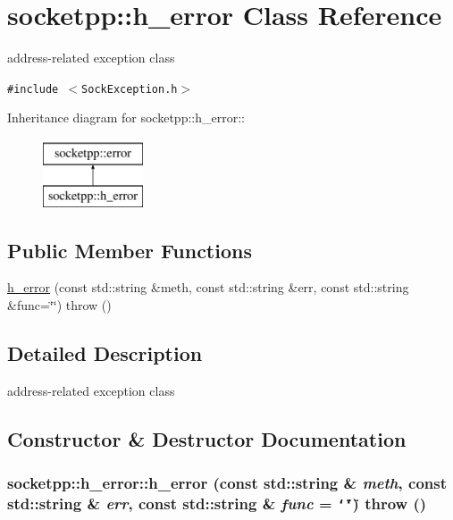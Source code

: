 \hypertarget{classsocketpp_1_1h__error}{
\section{socketpp::h\_\-error Class Reference}
\label{classsocketpp_1_1h__error}
}
address-related exception class  


{\tt \#include $<$SockException.h$>$}

Inheritance diagram for socketpp::h\_\-error::\begin{figure}[H]
\begin{center}
\leavevmode
\includegraphics[height=2cm]{classsocketpp_1_1h__error}
\end{center}
\end{figure}
\subsection*{Public Member Functions}
\begin{CompactItemize}
\item 
\hyperlink{classsocketpp_1_1h__error_c15a1c6216114250241349fdfcdeb98a}{h\_\-error} (const std::string \&meth, const std::string \&err, const std::string \&func=\char`\"{}\char`\"{})  throw ()
\end{CompactItemize}


\subsection{Detailed Description}
address-related exception class 

\subsection{Constructor \& Destructor Documentation}
\hypertarget{classsocketpp_1_1h__error_c15a1c6216114250241349fdfcdeb98a}{
\subsubsection[{h\_\-error}]{\setlength{\rightskip}{0pt plus 5cm}socketpp::h\_\-error::h\_\-error (const std::string \& {\em meth}, \/  const std::string \& {\em err}, \/  const std::string \& {\em func} = {\tt \char`\"{}\char`\"{}})  throw ()}}
\label{classsocketpp_1_1h__error_c15a1c6216114250241349fdfcdeb98a}


